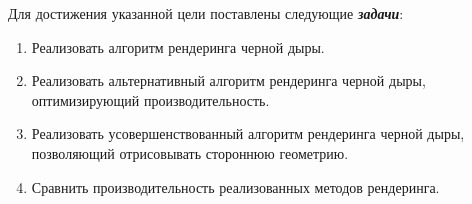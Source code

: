 Для достижения указанной цели поставлены следующие \textbf{\textit{задачи}}:

\begin{enumerate}
  \item Реализовать алгоритм рендеринга черной дыры.
  \item Реализовать альтернативный алгоритм рендеринга черной дыры, оптимизирующий производительность.
  \item Реализовать  усовершенствованный алгоритм рендеринга черной дыры, позволяющий отрисовывать стороннюю геометрию.
  \item Сравнить производительность реализованных методов рендеринга.
\end{enumerate}

\newpage

